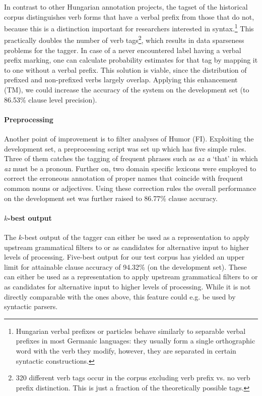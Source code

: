 In contrast to other Hungarian annotation projects, the tagset of the historical corpus distinguishes verb forms that have a verbal prefix from those that do not, because this is a distinction important for researchers interested in syntax.\footnote{Hungarian verbal prefixes or particles behave similarly to separable verbal prefixes in most Germanic languages: they usually form a single orthographic word with the verb they modify, however, they are separated in certain syntactic constructions.} 
This practically doubles the number of verb tags\footnote{320 different verb tags occur in the corpus excluding verb prefix vs. no verb prefix distinction. This is just a fraction of the theoretically possible tags.}, which results in data sparseness problems for the tagger. 
In case of a never encountered label having a verbal prefix marking, one can calculate probability estimates for that tag by mapping it to one without a verbal prefix. 
This solution is viable, since the distribution of prefixed and non-prefixed verbs largely overlap. 
Applying this enhancement (TM), we could increase the accuracy of the system on the development set (to 86.53\% clause level precision).

\paragraph{Preprocessing}

Another point of improvement is to filter analyses of Humor (FI). 
Exploiting the development set, a preprocessing script was set up which has five simple rules. 
Three of them catches the tagging of frequent phrases such as \emph{az a} `that' in which \emph{az} must be a pronoun. 
Further on, two domain specific lexicons were employed to correct the erroneous annotation of proper names that coincide with frequent common nouns or adjectives. 
Using these correction rules the overall performance on the development set was further raised to 86.77\% clause accuracy.



\paragraph{$k$-best output}
The $k$-best output of the tagger can either be used as a representation to apply upstream grammatical filters to or as candidates for alternative input to higher levels of processing. 
Five-best output for our test corpus has yielded an upper limit for attainable clause accuracy of 94.32\% (on the development set). 
These can either be used as a representation to apply upstream grammatical filters to or as candidates for alternative input to higher levels of processing.
While it is not directly comparable with the ones above, this feature could e.g. be used by syntactic parsers.


